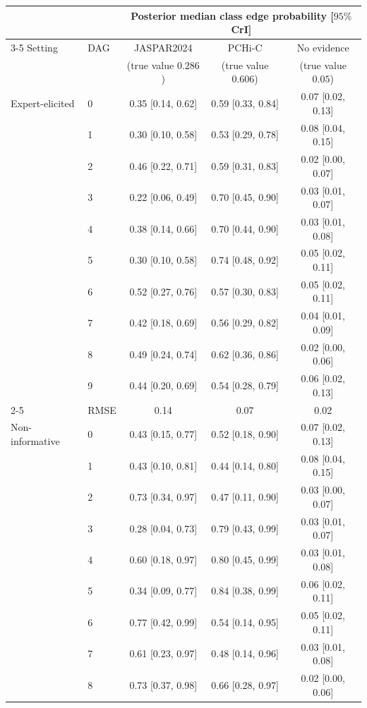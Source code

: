 \begin{tabular}{llccc}
\toprule
 & & \multicolumn{3}{c}{Posterior median class edge probability [$95\%$ CrI]} \\
\cmidrule(lr){3-5}
Setting & DAG & JASPAR2024 & PCHi-C & No evidence \\
 & & (true value $0.286$) & (true value $0.606$) & (true value $0.05$) \\
\midrule
Expert-elicited & 0 & 0.35 [0.14, 0.62] & 0.59 [0.33, 0.84] & 0.07 [0.02, 0.13] \\
 & 1 & 0.30 [0.10, 0.58] & 0.53 [0.29, 0.78] & 0.08 [0.04, 0.15] \\
 & 2 & 0.46 [0.22, 0.71] & 0.59 [0.31, 0.83] & 0.02 [0.00, 0.07] \\
 & 3 & 0.22 [0.06, 0.49] & 0.70 [0.45, 0.90] & 0.03 [0.01, 0.07] \\
 & 4 & 0.38 [0.14, 0.66] & 0.70 [0.44, 0.90] & 0.03 [0.01, 0.08] \\
 & 5 & 0.30 [0.10, 0.58] & 0.74 [0.48, 0.92] & 0.05 [0.02, 0.11] \\
 & 6 & 0.52 [0.27, 0.76] & 0.57 [0.30, 0.83] & 0.05 [0.02, 0.11] \\
 & 7 & 0.42 [0.18, 0.69] & 0.56 [0.29, 0.82] & 0.04 [0.01, 0.09] \\
 & 8 & 0.49 [0.24, 0.74] & 0.62 [0.36, 0.86] & 0.02 [0.00, 0.06] \\
 & 9 & 0.44 [0.20, 0.69] & 0.54 [0.28, 0.79] & 0.06 [0.02, 0.13] \\
\cmidrule{2-5}
 & RMSE & 0.14 & 0.07 & 0.02 \\
\midrule
Non-informative & 0 & 0.43 [0.15, 0.77] & 0.52 [0.18, 0.90] & 0.07 [0.02, 0.13] \\
 & 1 & 0.43 [0.10, 0.81] & 0.44 [0.14, 0.80] & 0.08 [0.04, 0.15] \\
 & 2 & 0.73 [0.34, 0.97] & 0.47 [0.11, 0.90] & 0.03 [0.00, 0.07] \\
 & 3 & 0.28 [0.04, 0.73] & 0.79 [0.43, 0.99] & 0.03 [0.01, 0.07] \\
 & 4 & 0.60 [0.18, 0.97] & 0.80 [0.45, 0.99] & 0.03 [0.01, 0.08] \\
 & 5 & 0.34 [0.09, 0.77] & 0.84 [0.38, 0.99] & 0.06 [0.02, 0.11] \\
 & 6 & 0.77 [0.42, 0.99] & 0.54 [0.14, 0.95] & 0.05 [0.02, 0.11] \\
 & 7 & 0.61 [0.23, 0.97] & 0.48 [0.14, 0.96] & 0.03 [0.01, 0.08] \\
 & 8 & 0.73 [0.37, 0.98] & 0.66 [0.28, 0.97] & 0.02 [0.00, 0.06] \\

\end{tabular}
